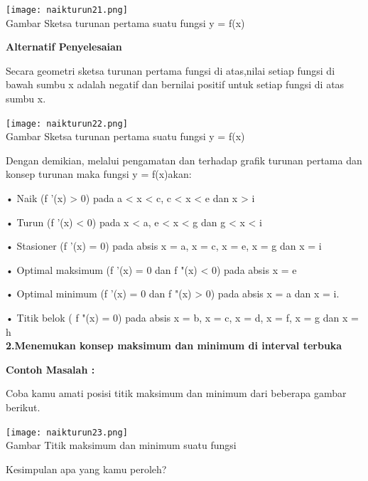 \documentclass[11pt,fleqn]{book} %
\begin{document}
\begin{center}
\texttt{[image: naikturun21.png]}\\
Gambar Sketsa turunan pertama suatu fungsi y = f(x)
\end{center}

\begin{flushleft}
\textbf{Alternatif Penyelesaian}

Secara geometri sketsa turunan pertama fungsi di atas,nilai setiap fungsi di bawah sumbu x adalah negatif dan bernilai positif untuk setiap fungsi di atas sumbu x.
\end{flushleft}

\begin{center}
\texttt{[image: naikturun22.png]}\\
Gambar Sketsa turunan pertama suatu fungsi y = f(x)
\end{center}

\begin{flushleft}
Dengan demikian, melalui pengamatan dan terhadap grafik turunan pertama dan konsep turunan maka fungsi y = f(x)akan:
\end{flushleft}

• Naik (f '(x) > 0) pada a < x < c, c < x < e dan x > i

• Turun (f '(x) < 0) pada x < a, e < x < g dan g < x < i

• Stasioner (f '(x) = 0) pada absis x = a, x = c, x = e, x = g dan x = i

• Optimal maksimum (f '(x) = 0 dan f "(x) < 0) pada absis x = e

• Optimal minimum (f '(x) = 0 dan f "(x) > 0) pada absis x = a dan x = i.

• Titik belok ( f "(x) = 0) pada absis x = b, x = c, x = d, x = f, x = g dan x = h\\

\textbf{2.Menemukan konsep maksimum dan minimum di interval terbuka}

\begin{flushleft}
\textbf{Contoh Masalah :}

Coba kamu amati posisi titik maksimum dan minimum
dari beberapa gambar berikut.
\end{flushleft}

\begin{center}
\texttt{[image: naikturun23.png]}\\
Gambar Titik maksimum dan minimum suatu fungsi
\end{center}

\begin{flushleft}
Kesimpulan apa yang kamu peroleh?
\end{flushleft}
\end{document}
